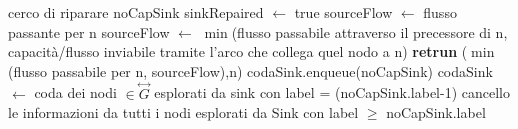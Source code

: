 \documentclass{article}
\begin{document}
\begin{algorithm}
\begin{algorithmic}[1]
\STATE cerco di riparare noCapSink
\STATE sinkRepaired $\leftarrow$ true
\STATE sourceFlow $\leftarrow$ flusso passante per n
\ELSE
\STATE sourceFlow $\leftarrow$ $\min$(flusso passabile attraverso il precessore di n, capacità/flusso inviabile tramite l'arco che collega quel nodo a n)
\ENDIF
{}
\STATE \textbf{retrun} ($\min$(flusso passabile per n, sourceFlow),n)
\ENDIF
\ENDFOR
\ENDIF
{}
\STATE codaSink.enqueue(noCapSink)
\ELSE
\STATE codaSink $\leftarrow$ coda dei nodi $\in \overset{\leftrightarrow}{G}$ esplorati da sink con label = (noCapSink.label-1)
\STATE cancello le informazioni da tutti i nodi esplorati da Sink con label $\ge$ noCapSink.label
\ENDIF
\ENDIF
{}

\end{algorithmic}
\end{algorithm}

\newpage
\end{document}
